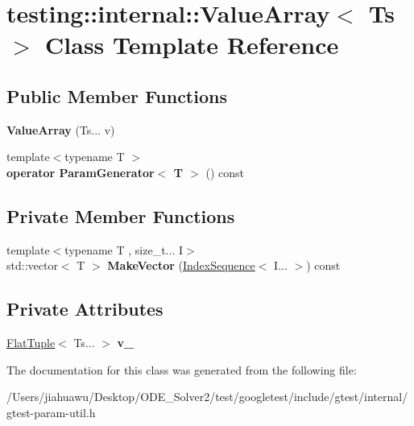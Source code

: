 \hypertarget{classtesting_1_1internal_1_1_value_array}{}\section{testing\+:\+:internal\+:\+:Value\+Array$<$ Ts $>$ Class Template Reference}
\label{classtesting_1_1internal_1_1_value_array}
\subsection*{Public Member Functions}
\begin{DoxyCompactItemize}
\item 
\mbox{\label{classtesting_1_1internal_1_1_value_array_acd7cd6a969a7e95152eac1787c42c9ed}} 
{\bfseries Value\+Array} (Ts... v)
\item 
\mbox{\label{classtesting_1_1internal_1_1_value_array_a019560f10debdce5f47bb18c0e5261b5}} 
{\footnotesize template$<$typename T $>$ }\\{\bfseries operator Param\+Generator$<$ T $>$} () const
\end{DoxyCompactItemize}
\subsection*{Private Member Functions}
\begin{DoxyCompactItemize}
\item 
\mbox{\label{classtesting_1_1internal_1_1_value_array_a738073a57459083586285f5055aeac19}} 
{\footnotesize template$<$typename T , size\+\_\+t... I$>$ }\\std\+::vector$<$ T $>$ {\bfseries Make\+Vector} (\mbox{\hyperlink{structtesting_1_1internal_1_1_index_sequence}{Index\+Sequence}}$<$ I... $>$) const
\end{DoxyCompactItemize}
\subsection*{Private Attributes}
\begin{DoxyCompactItemize}
\item 
\mbox{\label{classtesting_1_1internal_1_1_value_array_a13322bd870795fdd18dde7f95c4cedb0}} 
\mbox{\hyperlink{classtesting_1_1internal_1_1_flat_tuple}{Flat\+Tuple}}$<$ Ts... $>$ {\bfseries v\+\_\+}
\end{DoxyCompactItemize}


The documentation for this class was generated from the following file\+:\begin{DoxyCompactItemize}
\item 
/\+Users/jiahuawu/\+Desktop/\+O\+D\+E\+\_\+\+Solver2/test/googletest/include/gtest/internal/gtest-\/param-\/util.\+h\end{DoxyCompactItemize}
